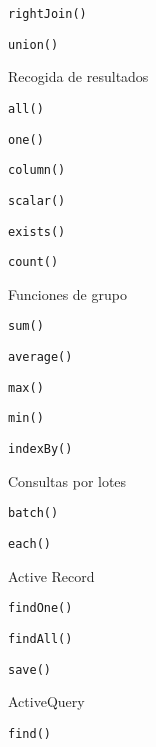 \begin{longenum}
\begin{longenum}
\begin{longenum}
\begin{longenum}
\begin{longenum}
                    \item \texttt{rightJoin()}
                \end{longenum}
                \item \texttt{union()}
            \end{longenum}
            \item Recogida de resultados
            \begin{longenum}
                \item \texttt{all()}
                \item \texttt{one()}
                \item \texttt{column()}
                \item \texttt{scalar()}
                \item \texttt{exists()}
                \item \texttt{count()}
                \item Funciones de grupo
                \begin{longenum}
                    \item \texttt{sum()}
                    \item \texttt{average()}
                    \item \texttt{max()}
                    \item \texttt{min()}
                \end{longenum}
                \item \texttt{indexBy()}
            \end{longenum}
            \item Consultas por lotes
            \begin{longenum}
                \item \texttt{batch()}
                \item \texttt{each()}
            \end{longenum}
        \end{longenum}
        \item Active Record
        \begin{longenum}
            \item \texttt{findOne()}
            \item \texttt{findAll()}
            \item \texttt{save()}
            \item ActiveQuery
            \begin{longenum}
                \item \texttt{find()}

\end{longenum}
\end{longenum}
\end{longenum}
\end{longenum}
